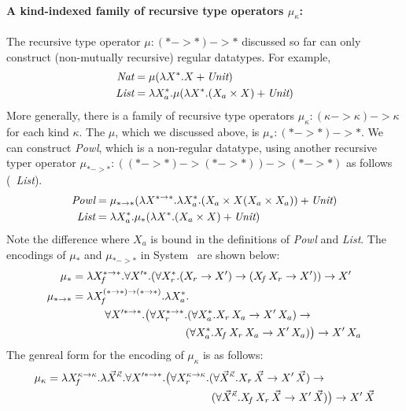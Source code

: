 \paragraph{A kind-indexed family of recursive type operators $\mu_\kappa$:}
The recursive type operator $\mu : (* -> *) -> *$ discussed so far can only
construct (non-mutually recursive) regular datatypes. For example,
\begin{align*}
\textit{Nat} &= \mu(\lambda X^{*}.X + \textit{Unit}) \\
\textit{List} &= \lambda X_a^{*}.\mu(\lambda X^{*}.(X_a\times X) + \textit{Unit})
\end{align*}
More generally, there is a family of recursive type operators
$\mu_\kappa : (\kappa -> \kappa) -> \kappa$ for each kind $\kappa$.
The $\mu$, which we discussed above, is $\mu_{*} : (* -> *) -> *$.
We can construct \textit{Powl}, which is a non-regular datatype, using another
recursive typer operator $\mu_{* -> *} : ((*-> *) -> (*-> *)) -> (*-> *) $
as follows (\cf\ \textit{List}).
\begin{align*}
\textit{Powl} &= \mu_{* -> *}(\lambda X^{* -> *}.\lambda X_a^{*}.
                        (X_a\times X(X_a\times X_a)) + \textit{Unit}) \\
\textit{List} &= \lambda X_a^{*}.\mu_{*}(\lambda X^{*}.(X_a\times X) + \textit{Unit})
\end{align*}
Note the difference where $X_a$ is bound in the definitions of \textit{Powl}
and \textit{List}. The encodings of $\mu_{*}$ and $\mu_{*-> *}$ in System \Fw\ 
are shown below:
\begin{align*}
\mu_{*} &=
 \lambda X_{\!f}^{* -> *}.\forall X'^{*}.
 (\forall X_r^{*}.(X_r -> X') -> (X_{\!f}\,X_r -> X')) -> X' \\
\mu_{* -> *} &=
 \lambda X_{\!f}^{(*-> *) -> (*-> *)}.\lambda X_a^{*}.\\&\qquad\quad \forall X'^{*-> *}.
 \big(\forall X_r^{*-> *}.
        (\forall X_a^{*}.X_r\,X_a -> X'\,X_a) -> \\&\qquad\qquad\qquad\qquad\qquad~
        (\forall X_a^{*}.X_{\!f}\,X_r\,X_a -> X'\,X_a)\big) -> X'\,X_a
\end{align*}
The genreal form for the encoding of $\mu_\kappa$
is as follows:
\begin{align*}
\mu_{\kappa} &=
 \lambda X_{\!f}^{\kappa -> \kappa}.\lambda \vec{X}^{\vec{\kappa}}.
 \forall X'^{*-> *}.
 \big(\forall X_r^{\kappa -> \kappa}.
 (\forall \vec{X}^{\vec{\kappa}}.X_r\,\vec{X} -> X'\,\vec{X}) -> \\
 &\qquad\qquad\qquad\qquad\qquad\qquad\qquad\quad
 (\forall \vec{X}^{\vec{\kappa}}.X_{\!f}\,X_r\,\vec{X} -> X'\,\vec{X})
 \big) -> X'\,\vec{X}
\end{align*}
